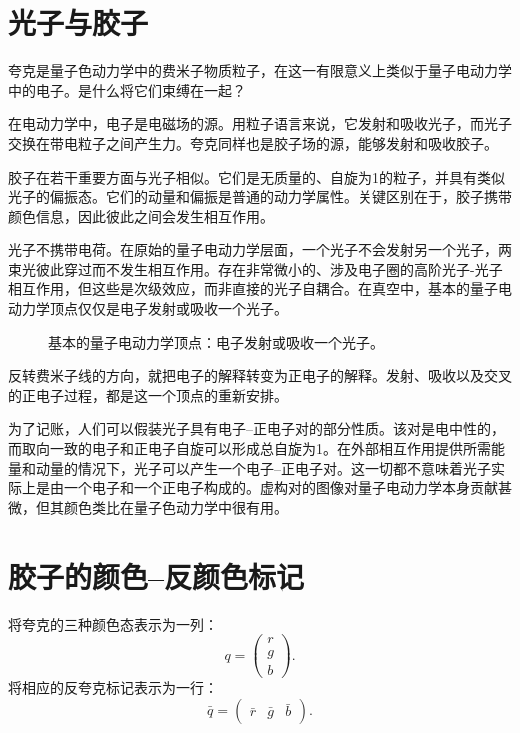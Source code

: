 \section{光子与胶子}

夸克是量子色动力学中的费米子物质粒子，在这一有限意义上类似于量子电动力学中的电子。是什么将它们束缚在一起？

在电动力学中，电子是电磁场的源。用粒子语言来说，它发射和吸收光子，而光子交换在带电粒子之间产生力。夸克同样也是胶子场的源，能够发射和吸收胶子。

胶子在若干重要方面与光子相似。它们是无质量的、自旋为1的粒子，并具有类似光子的偏振态。它们的动量和偏振是普通的动力学属性。关键区别在于，胶子携带颜色信息，因此彼此之间会发生相互作用。

光子不携带电荷。在原始的量子电动力学层面，一个光子不会发射另一个光子，两束光彼此穿过而不发生相互作用。存在非常微小的、涉及电子圈的高阶光子-光子相互作用，但这些是次级效应，而非直接的光子自耦合。在真空中，基本的量子电动力学顶点仅仅是电子发射或吸收一个光子。

\begin{figure}[h]
\centering
{}
\caption{基本的量子电动力学顶点：电子发射或吸收一个光子。}
\end{figure}

反转费米子线的方向，就把电子的解释转变为正电子的解释。发射、吸收以及交叉的正电子过程，都是这一个顶点的重新安排。

为了记账，人们可以假装光子具有电子--正电子对的部分性质。该对是电中性的，而取向一致的电子和正电子自旋可以形成总自旋为1。在外部相互作用提供所需能量和动量的情况下，光子可以产生一个电子--正电子对。这一切都不意味着光子实际上是由一个电子和一个正电子构成的。虚构对的图像对量子电动力学本身贡献甚微，但其颜色类比在量子色动力学中很有用。

\section{胶子的颜色--反颜色标记}

将夸克的三种颜色态表示为一列：
\begin{equation}
q=
\begin{pmatrix}
r\\
g\\
b
\end{pmatrix}.
\end{equation}
将相应的反夸克标记表示为一行：
\begin{equation}
\bar q=
\begin{pmatrix}
\bar r&\bar g&\bar b
\end{pmatrix}.
\end{equation}

